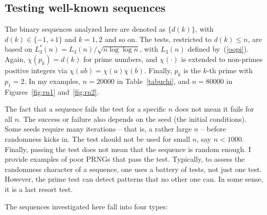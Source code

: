 \documentclass[oneside,10pt]{book}
\begin{document}
\subsection{Testing well-known sequences}\label{twist}

The binary sequences analyzed here are denoted as $\{d(k)\}$, with $d(k)\in\{-1,+1\}$ and $k=1,2$ and so on. 
The tests, restricted to $d(k)\leq n$, are based on 
$L^*_3(n)=L_3(n)/\sqrt{n\log\log n}$, with  $L_3(n)$ defined by~(\ref{oopi}). Again, $\chi(p_k)=d(k)$ for prime numbers,
and $\chi(\cdot)$ is extended to non-primes positive integers via $\chi(ab)=\chi(a)\chi(b)$. Finally,
 $p_k$ is the $k$-th prime with $p_1=2$. In my examples, $n=\num{20000}$ in Table~\ref{tabuchi}, and $n=\num{80000}$ 
 in Figures~\ref{fig:rn1} and~\ref{fig:rn2}.  

The fact that a sequence fails the test for a specific $n$ does not mean it fails for all $n$. The success or failure also depends on the seed (the initial conditions). Some seeds require many iterations -- that is, a rather large $n$ -- before randomness kicks in. The test should not be used for small $n$, say $n<1000$. Finally, passing the test does not mean that the sequence is random enough. I provide examples of poor PRNGs that pass the test. Typically, to assess the randomness character of a sequence, one uses a battery of tests, not just one test. However, the prime test can detect patterns that no other one can. In some sense, it is a last resort test.

\noindent The sequences investigated here fall into four types:
\end{document}
